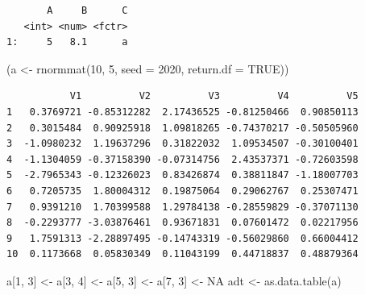 \documentclass[
]{book}
\newenvironment{Shaded}{\begin{snugshade}}{\end{snugshade}}
\newcommand{\AttributeTok}[1]{\textcolor[rgb]{0.77,0.63,0.00}{#1}}
\newcommand{\ConstantTok}[1]{\textcolor[rgb]{0.00,0.00,0.00}{#1}}
\newcommand{\DecValTok}[1]{\textcolor[rgb]{0.00,0.00,0.81}{#1}}
\newcommand{\FunctionTok}[1]{\textcolor[rgb]{0.00,0.00,0.00}{#1}}
\newcommand{\NormalTok}[1]{#1}
\newcommand{\OtherTok}[1]{\textcolor[rgb]{0.56,0.35,0.01}{#1}}
\newcommand{\SpecialCharTok}[1]{\textcolor[rgb]{0.00,0.00,0.00}{#1}}
\begin{document}
\begin{verbatim}
       A     B      C
   <int> <num> <fctr>
1:     5   8.1      a
\end{verbatim}

\begin{Shaded}
\begin{Highlighting}[]
\NormalTok{(a }\OtherTok{\textless{}{-}} \FunctionTok{rnormmat}\NormalTok{(}\DecValTok{10}\NormalTok{, }\DecValTok{5}\NormalTok{, }\AttributeTok{seed =} \DecValTok{2020}\NormalTok{, }\AttributeTok{return.df =} \ConstantTok{TRUE}\NormalTok{))}
\end{Highlighting}
\end{Shaded}

\begin{verbatim}
           V1          V2          V3          V4          V5
1   0.3769721 -0.85312282  2.17436525 -0.81250466  0.90850113
2   0.3015484  0.90925918  1.09818265 -0.74370217 -0.50505960
3  -1.0980232  1.19637296  0.31822032  1.09534507 -0.30100401
4  -1.1304059 -0.37158390 -0.07314756  2.43537371 -0.72603598
5  -2.7965343 -0.12326023  0.83426874  0.38811847 -1.18007703
6   0.7205735  1.80004312  0.19875064  0.29062767  0.25307471
7   0.9391210  1.70399588  1.29784138 -0.28559829 -0.37071130
8  -0.2293777 -3.03876461  0.93671831  0.07601472  0.02217956
9   1.7591313 -2.28897495 -0.14743319 -0.56029860  0.66004412
10  0.1173668  0.05830349  0.11043199  0.44718837  0.48879364
\end{verbatim}

\begin{Shaded}
\begin{Highlighting}[]
\NormalTok{a[}\DecValTok{1}\NormalTok{, }\DecValTok{3}\NormalTok{] }\OtherTok{\textless{}{-}}\NormalTok{ a[}\DecValTok{3}\NormalTok{, }\DecValTok{4}\NormalTok{] }\OtherTok{\textless{}{-}}\NormalTok{ a[}\DecValTok{5}\NormalTok{, }\DecValTok{3}\NormalTok{] }\OtherTok{\textless{}{-}}\NormalTok{ a[}\DecValTok{7}\NormalTok{, }\DecValTok{3}\NormalTok{] }\OtherTok{\textless{}{-}} \ConstantTok{NA}
\NormalTok{adt }\OtherTok{\textless{}{-}} \FunctionTok{as.data.table}\NormalTok{(a)}
\end{Highlighting}
\end{Shaded}

\begin{Shaded}
\end{Shaded}
\end{document}
